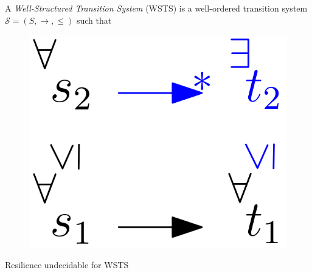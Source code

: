\documentclass{beamer}
\begin{document}
  \begin{frame}

\begin{definition}
A {\em Well-Structured Transition System} (WSTS) 
is a well-ordered transition system $\mathscr{S}=(S, \rightarrow, \leq)$ such that   
\end{definition}


   \begin{center}
 	\begin{figure}
\includegraphics[width=.25\textwidth]{WSTS_def}
	\end{figure}
\end{center}  

\pause

\begin{theorem}
{\sc Resilience} undecidable for WSTS
\end{theorem}







  \end{frame}
\end{document}
